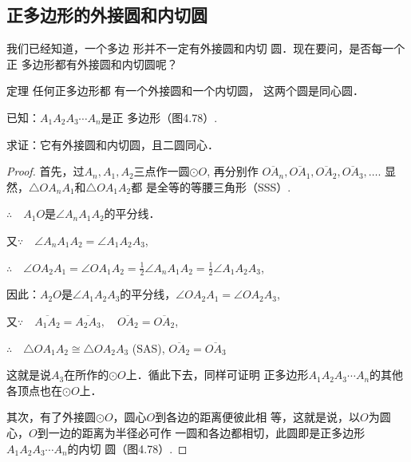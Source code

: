 \subsection{正多边形的外接圆和内切圆}
我们已经知道，一个多边
形并不一定有外接圆和内切
圆．现在要问，是否每一个正
多边形都有外接圆和内切圆呢？

\begin{blk}
  {定理} 任何正多边形都
有一个外接圆和一个内切圆，
这两个圆是同心圆．
\end{blk}

已知：$A_1A_2A_3\cdots A_n$是正
多边形（图4.78）.

求证：它有外接圆和内切圆，且二圆同心．

\begin{figure}[htp]
  \centering
  \caption{}
\end{figure}


\begin{proof}
首先，过$A_n,A_1,A_2$三点作一圆$\odot O$, 再分别作
$\overline{OA_n},\overline{OA_1},\overline{OA_2},\overline{OA_3},\ldots$. 显然，$\triangle OA_nA_1$和$\triangle OA_1A_2$都
是全等的等腰三角形（SSS）.

$\therefore\quad A_1O$是$\angle A_nA_1A_2$的平分线．

又$\because\quad \angle A_nA_1A_2=\angle A_1A_2A_3$,

$\therefore\quad \angle OA_2A_1=\angle OA_1A_2=\frac{1}{2}\angle A_nA_1A_2=\frac{1}{2}\angle A_1A_2A_3$,

因此：$A_2O$是$\angle A_1A_2A_3$的平分线，$\angle OA_2A_1=\angle OA_2A_3$,

又$\because\quad \overline{A_1A_2}=\overline{A_2A_3},\quad \overline{OA_2}=\overline{OA_2}$,

$\therefore\quad \triangle OA_1A_2\cong \triangle OA_2A_3$ (SAS), $\overline{OA_2}=\overline{OA_3}$

这就是说$A_3$在所作的$\odot O$上．循此下去，同样可证明
正多边形$A_1A_2A_3\cdots A_n$的其他各顶点也在$\odot O$上．

其次，有了外接圆$\odot O$，圆心$O$到各边的距离便彼此相
等，这就是说，以$O$为圆心，$O$到一边的距离为半径必可作
一圆和各边都相切，此圆即是正多边形$A_1A_2A_3\cdots A_n$的内切
圆（图4.78）.
\end{proof}


